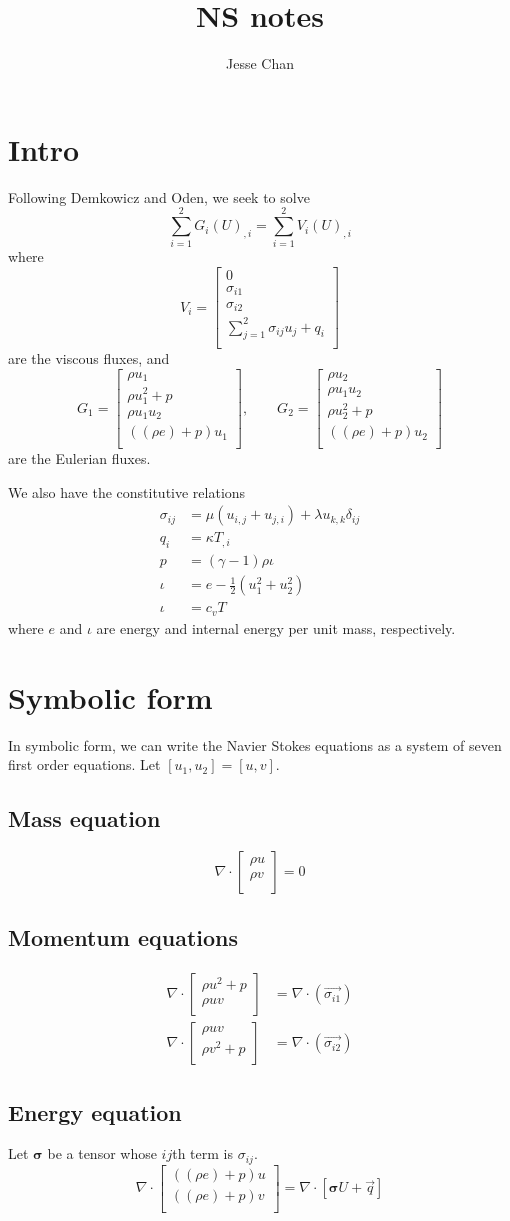 \documentclass{article}
\date{}
\author{Jesse Chan}
\title{NS notes}
\newcommand{\grad}{\nabla}
\renewcommand{\div}{\grad \cdot}
\def\vecttwo#1#2{\left[
\begin{array}{c}
#1\\
#2\\
\end{array}
\right]}
\def\vectfour#1#2#3#4{\left[
\begin{array}{c}
#1\\
#2\\
#3\\
#4\\
\end{array}
\right]}
\begin{document}
\section{Intro}

Following Demkowicz and Oden, we seek to solve 
\[
\sum^2_{i=1} G_i\left( U\right)_{,i}=\sum^2_{i=1} V_i\left( U\right)_{,i}
\]
where
\[
V_i = \vectfour{0}{\sigma_{i1}}{\sigma_{i2}}{\sum_{j=1}^2\sigma_{ij}u_j + q_i}
\]
are the viscous fluxes, and 
\[
 G_1 = \vectfour{\rho u_1}{\rho u_1^2+p}{\rho u_1 u_2}{((\rho e)+p)u_1}, \qquad G_2 = \vectfour{\rho u_2}{\rho u_1 u_2}{\rho u_2^2+p}{((\rho e)+p)u_2}
\]
are the Eulerian fluxes. 

We also have the constitutive relations 
\begin{align*}
\sigma_{ij} &= \mu(u_{i,j}+u_{j,i}) + \lambda u_{k,k}\delta_{ij}\\
q_i &= \kappa T_{,i}\\
p &= (\gamma-1)\rho\iota\\
\iota &= e-\frac{1}{2}(u_1^2+u_2^2)\\
\iota &= c_vT
\end{align*}
where $e$ and $\iota$ are energy and internal energy per unit mass, respectively.  

\section{Symbolic form}
In symbolic form, we can write the Navier Stokes equations as a system of seven first order equations. Let $[u_1,u_2] = [u,v]$. 

\subsection{Mass equation}
\[
\div \vecttwo{\rho u }{\rho v} = 0
\]
\subsection{Momentum equations}
\begin{align*}
\div \vecttwo{\rho u^2+p }{\rho u v} &= \div\left(\vec{\sigma_{i1}}\right)\\
\div \vecttwo{\rho u v}{\rho v^2+p } &= \div\left(\vec{\sigma_{i2}}\right)
\end{align*}
\subsection{Energy equation}
Let $\boldsymbol \sigma$ be a tensor whose $ij$th term is $\sigma_{ij}$.  
\[
\div\vecttwo{((\rho e)+p)u}{((\rho e)+p)v} = \div\left[\boldsymbol\sigma U + \vec{q}\right]
\]
\end{document}
